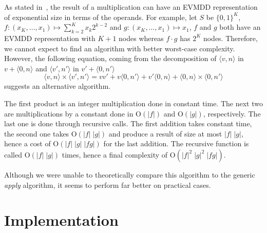 \documentclass[a4paper]{easychair}
\renewcommand{\O}[1]{\mathrm{O}\left(#1\right)}
\newcommand{\edge}[2]{\langle #1, #2 \rangle}
\begin{document}
As stated in~\cite{Lai1996},
the result of a multiplication can have an EVMDD
representation of exponential size in terms of the operands.
For example, let $S$ be $\{0, 1\}^K$, $f : (x_K,\ldots, x_1) \mapsto \sum_{k=2}^K x_k2^{k-2}$
and $g : (x_K,\ldots, x_1) \mapsto x_1$, $f$ and $g$ both have an EVMDD representation with $K+1$ nodes
whereas $f{\cdot}g$ has $2^K$ nodes.
Therefore, we cannot expect to find an algorithm with better worst-case
complexity. However, the following equation, coming from the decomposition
of $\edge{v}{n}$ in $v + \edge{0}{n}$ and $\edge{v'}{n'}$ in $v' + \edge{0}{n'}$
$$
\edge{v}{n}\times\edge{v'}{n'} = vv'+v\edge{0}{n'}+v'\edge{0}{n}+\edge{0}{n}\times\edge{0}{n'}
$$
suggests an alternative algorithm.

The first product is an integer multiplication done in constant time.
The next two are multiplications by a constant done in $\O{|f|}$ and $\O{|g|}$, respectively.
The last one is done through recursive calls.
The first addition takes constant time, the second one
takes $\O{|f|\;|g|}$ and produce a result of size at most $|f|\;|g|$,
hence a cost of $\O{|f|\;|g|\;|fg|}$ for the last addition.
The recursive function is called $\O{|f|\;|g|}$ times, hence a final complexity
of $\O{|f|^2\;|g|^2\;|fg|}$.

Although we were unable to theoretically compare this algorithm to
the generic \emph{apply} algorithm, it seems to perform
far better on practical cases.

\section{Implementation}
\end{document}
